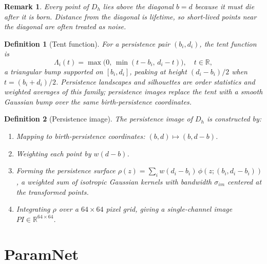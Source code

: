 \documentclass[11pt,a4paper]{article}
\newcommand{\R}{\mathbb{R}}
\theoremstyle{definitioncolon}
\newtheorem{definition}{Definition}[section]
\newtheorem*{remark}{Remark}
\begin{document}
    \begin{remark}
        Every point of $D_h$ lies above the diagonal $b=d$ because it must die
        after it is born. Distance from the diagonal is lifetime, so short-lived
        points near the diagonal are often treated as noise.
    \end{remark}

    \begin{definition}[Tent function]
    \label{def:tent}
        For a persistence pair $(b_i, d_i)$, the tent function is
            \[
            \Lambda_i(t) = \max\bigl(0,\, \min(t - b_i,\, d_i - t)\bigr),
            \quad t \in \R,
            \]
        a triangular bump supported on $[b_i, d_i]$, peaking at height
        $(d_i-b_i)/2$ when $t = (b_i+d_i)/2$. Persistence landscapes and
        silhouettes are order statistics and weighted averages of this family;
        persistence images replace the tent with a smooth Gaussian bump over
        the same birth-persistence coordinates.
    \end{definition}

    \begin{definition}[Persistence image]
    \label{def:per_image}
        The persistence image of $D_h$ is constructed by:
            \begin{enumerate}
                \item Mapping to birth-persistence coordinates:
                      $(b,d) \mapsto (b, d-b)$.
                \item Weighting each point by $w(d-b)$.
                \item Forming the persistence surface
                      $\rho(z) = \sum_i w(d_i - b_i)\,
                      \phi(z; (b_i, d_i - b_i))$, a weighted sum of isotropic
                      Gaussian kernels with bandwidth $\sigma_{im}$ centered at
                      the transformed points.
                \item Integrating $\rho$ over a $64 \times 64$ pixel grid,
                      giving a single-channel image $PI \in \R^{64 \times 64}$.
            \end{enumerate}
    \end{definition}


\section{ParamNet}
\label{sec:progress}
\end{document}
